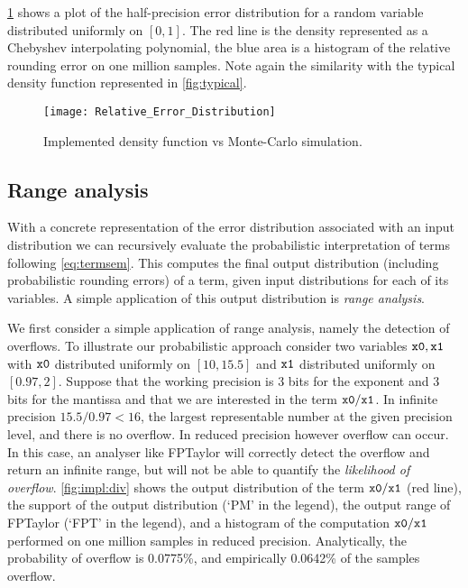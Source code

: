 \documentclass[10pt,conference]{IEEEtran}
\begin{document}
\cref{fig:impl:errdist} shows a plot of the half-precision error distribution for a random variable distributed uniformly on $\left[0,1\right]$. The red line is the density represented as a Chebyshev interpolating polynomial, the blue area is a histogram of the relative rounding error on one million samples. Note again the similarity with the typical density function represented in \cref{fig:typical}.

\begin{figure}[h!]
\texttt{[image: Relative\_Error\_Distribution]}
\caption{Implemented density function vs Monte-Carlo simulation.}
\label{fig:impl:errdist}
\end{figure}

\subsection{Range analysis}
With a concrete representation of the error distribution associated with an input distribution we can recursively evaluate the probabilistic interpretation of terms following \eqref{eq:termsem}. This computes the final output distribution (including probabilistic rounding errors) of a term, given input distributions for each of its variables. A simple application of this output distribution is \emph{range analysis}. 

We first consider a simple application of range analysis, namely the detection of overflows. To illustrate our probabilistic approach consider two variables $\tt x0, x1$ with $\tt x0$ distributed uniformly on $\left[10, 15.5\right]$ and $\tt x1$ distributed uniformly on $\left[0.97,2\right]$. Suppose that the working precision is 3 bits for the exponent and 3 bits for the mantissa and that we are interested in the term $\tt x0/x1$. In infinite precision $15.5/0.97 < 16$, the largest representable number at the given precision level, and there is no overflow. In reduced precision however overflow can occur. In this case, an analyser like FPTaylor will correctly detect the overflow and return an infinite range, but will not be able to quantify the \emph{likelihood of overflow}. \cref{fig:impl:div} shows the output distribution of the term $\tt x0/x1$ (red line), the support of the output distribution (`PM' in the legend), the output range of FPTaylor (`FPT' in the legend), and a histogram of the computation $\tt x0/x1$ performed on one million samples in reduced precision. Analytically, the probability of overflow is 0.0775\%, and empirically 0.0642\% of the samples overflow.
\end{document}
